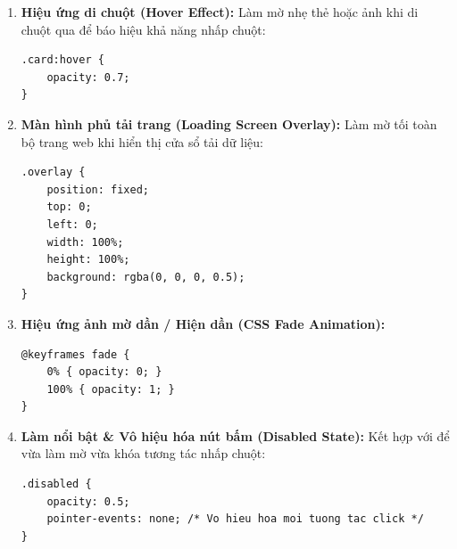 \begin{conceptBox}
\begin{enumerate}[leftmargin=1.5em, itemsep=5pt, parsep=0pt]
    \item \textbf{Hiệu ứng di chuột (Hover Effect):} Làm mờ nhẹ thẻ hoặc ảnh khi di chuột qua để báo hiệu khả năng nhấp chuột:
\begin{codeWindow}
\begin{lstlisting}[language=CSS3]
.card:hover {
    opacity: 0.7;
}
\end{lstlisting}
\end{codeWindow}

    \item \textbf{Màn hình phủ tải trang (Loading Screen Overlay):} Làm mờ tối toàn bộ trang web khi hiển thị cửa sổ tải dữ liệu:
\begin{codeWindow}
\begin{lstlisting}[language=CSS3]
.overlay {
    position: fixed;
    top: 0;
    left: 0;
    width: 100%;
    height: 100%;
    background: rgba(0, 0, 0, 0.5);
}
\end{lstlisting}
\end{codeWindow}

    \item \textbf{Hiệu ứng ảnh mờ dần / Hiện dần (CSS Fade Animation):}
\begin{codeWindow}
\begin{lstlisting}[language=CSS3]
@keyframes fade {
    0% { opacity: 0; }
    100% { opacity: 1; }
}
\end{lstlisting}
\end{codeWindow}

    \item \textbf{Làm nổi bật \& Vô hiệu hóa nút bấm (Disabled State):} Kết hợp  với  để vừa làm mờ vừa khóa tương tác nhấp chuột:
\begin{codeWindow}
\begin{lstlisting}[language=CSS3]
.disabled {
    opacity: 0.5;
    pointer-events: none; /* Vo hieu hoa moi tuong tac click */
}
\end{lstlisting}
\end{codeWindow}
\end{enumerate}
\end{conceptBox}

